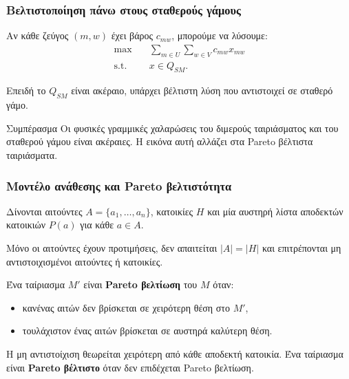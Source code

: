 \documentclass{beamer}
\begin{document}
	\begin{frame}
		\frametitle{Βελτιστοποίηση πάνω στους σταθερούς γάμους}
		
		Αν κάθε ζεύγος $(m,w)$ έχει βάρος $c_{mw}$, μπορούμε να λύσουμε:
		\[
		\begin{aligned}
			\max \quad &
			\sum_{m\in U}\sum_{w\in V}c_{mw}x_{mw}\\
			\text{s.t.}\quad &
			x\in Q_{SM}.
		\end{aligned}
		\]
		
		Επειδή το $Q_{SM}$ είναι ακέραιο, υπάρχει βέλτιστη λύση που αντιστοιχεί σε σταθερό γάμο.
		
		\begin{block}{Συμπέρασμα}
			Οι φυσικές γραμμικές χαλαρώσεις του διμερούς ταιριάσματος και του σταθερού γάμου είναι ακέραιες. Η εικόνα αυτή αλλάζει στα Pareto βέλτιστα ταιριάσματα.
		\end{block}
	\end{frame}
	
	
	\begin{frame}
		\frametitle{Μοντέλο ανάθεσης και Pareto βελτιστότητα}
		
		Δίνονται αιτούντες $A=\{a_1,\ldots,a_n\}$, κατοικίες $H$ και μία αυστηρή λίστα αποδεκτών κατοικιών $P(a)$ για κάθε $a\in A$.
		
		Μόνο οι αιτούντες έχουν προτιμήσεις, δεν απαιτείται $|A|=|H|$ και επιτρέπονται μη αντιστοιχισμένοι αιτούντες ή κατοικίες.
		
		\vspace{0.2cm}
		
		Ένα ταίριασμα $M'$ είναι \textbf{Pareto βελτίωση} του $M$ όταν:
		
		\begin{itemize}
			\item κανένας αιτών δεν βρίσκεται σε χειρότερη θέση στο $M'$,
			\item τουλάχιστον ένας αιτών βρίσκεται σε αυστηρά καλύτερη θέση.
		\end{itemize}
		
		Η μη αντιστοίχιση θεωρείται χειρότερη από κάθε αποδεκτή κατοικία. Ένα ταίριασμα είναι \textbf{Pareto βέλτιστο} όταν δεν επιδέχεται Pareto βελτίωση.
	\end{frame}
	
\end{document}

